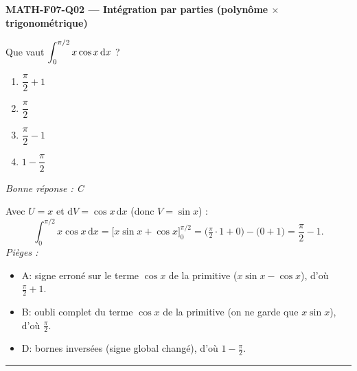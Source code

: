 \documentclass[11pt,a4paper]{article}
\begin{document}
\noindent\textbf{MATH-F07-Q02 --- Intégration par parties (polynôme $\times$ trigonométrique)}\par
Que vaut $\displaystyle\int_{0}^{\pi/2} x\cos x\,\mathrm{d}x$ ?
\begin{enumerate}[label=\Alph*)]
\item $\dfrac{\pi}{2}+1$
\item $\dfrac{\pi}{2}$
\item $\dfrac{\pi}{2}-1$
\item $1-\dfrac{\pi}{2}$
\end{enumerate}
\textit{Bonne réponse : C}\par
Avec $U=x$ et $\mathrm{d}V=\cos x\,\mathrm{d}x$ (donc $V=\sin x$) :
\[
\int_{0}^{\pi/2} x\cos x\,\mathrm{d}x=\big[x\sin x+\cos x\big]_{0}^{\pi/2}
=\Big(\tfrac{\pi}{2}\cdot 1+0\Big)-\big(0+1\big)=\dfrac{\pi}{2}-1.
\]
\textit{Pièges :}
\begin{itemize}
\item A: signe erroné sur le terme $\cos x$ de la primitive ($x\sin x-\cos x$), d'où $\tfrac{\pi}{2}+1$.
\item B: oubli complet du terme $\cos x$ de la primitive (on ne garde que $x\sin x$), d'où $\tfrac{\pi}{2}$.
\item D: bornes inversées (signe global changé), d'où $1-\tfrac{\pi}{2}$.
\end{itemize}
\vspace{8pt}\hrule\vspace{8pt}
\end{document}
